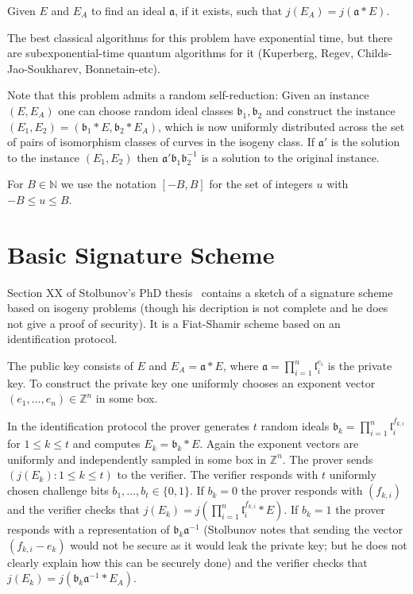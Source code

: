 \documentclass{llncs}
\newcommand{\N}{\mathbb{N}}
\newcommand{\Z}{\mathbb{Z}}
\renewcommand{\a}{\mathfrak{a}}
\renewcommand{\b}{\mathfrak{b}}
\renewcommand{\l}{\mathfrak{l}}
\begin{document}
\begin{definition}\label{defn:ass1}
Given $E$ and $E_A$ to find an ideal $\a$, if it exists, such that $j( E_A ) = j( \a * E )$.
\end{definition}

The best classical algorithms for this problem have exponential time, but there are subexponential-time quantum algorithms for it (Kuperberg, Regev, Childs-Jao-Soukharev, Bonnetain-etc).

Note that this problem admits a random self-reduction: Given an instance $(E, E_A)$ one can choose random ideal classes $\b_1, \b_2$ and construct the instance $(E_1, E_2) = (\b_1 * E, \b_2 * E_A )$, which is now uniformly distributed across the set of pairs of isomorphism classes of curves in the isogeny class.
If $\a'$ is the solution to the instance $(E_1, E_2)$ then $\a'\b_1 \b_2^{-1}$ is a solution to the original instance.


For $B \in \N$ we use the notation $[-B,B]$ for the set of integers $u$ with $-B \le u \le B$.


\section{Basic Signature Scheme}

Section XX of Stolbunov's PhD thesis~\cite{Sto12} contains a sketch of a signature scheme based on isogeny problems (though his decription is not complete and he does not give a proof of security).
It is a Fiat-Shamir scheme based on an identification protocol.

The public key consists of $E$ and $E_A = \a * E$, where $\a = \prod_{i=1}^n \l_i^{e_i}$ is the private key.
To construct the private key one uniformly chooses an exponent vector $(e_1, \dots, e_n) \in \Z^n$ in some box.

In the identification protocol the prover generates $t$ random ideals $\b_k = \prod_{i=1}^n \l_i^{f_{k,i}}$ for $1 \le k \le t$ and computes $E_k = \b_k * E$.
Again the exponent vectors are uniformly and independently sampled in some box in $\Z^n$.
The prover sends $(j( E_k ) : 1 \le k \le t )$ to the verifier.
The verifier responds with $t$ uniformly chosen challenge bits $b_1, \dots, b_t \in \{0,1\}$.
If $b_k = 0$ the prover responds with $( f_{k,i} )$ and the verifier checks that $j(E_k) = j( \prod_{i=1}^n \l_i^{f_{k,i}} * E )$.
If $b_k = 1$ the prover responds with a representation of $\b_k \a^{-1}$ (Stolbunov notes that sending the vector $(f_{k,i} - e_k )$ would not be secure as it would leak the private key; but he does not clearly explain how this can be securely done) and the verifier checks that $j(E_k) = j( \b_k \a^{-1} * E_A )$.
\end{document}
